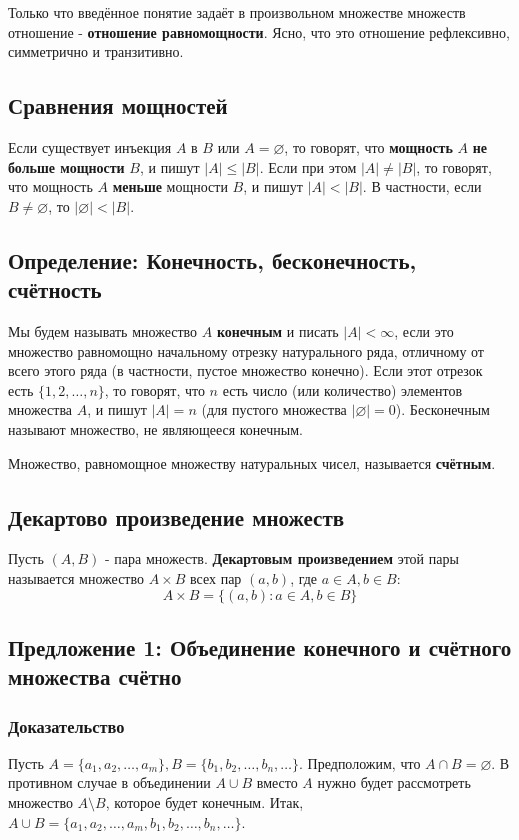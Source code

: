 \documentclass{article}
\begin{document}
Только что введённое понятие задаёт в произвольном множестве множеств отношение - \textbf{отношение равномощности}. Ясно, что это отношение рефлексивно, симметрично и транзитивно.

\subsection{Сравнения мощностей}

Если существует инъекция $A$ в $B$ или $A = \varnothing$, то говорят, что \textbf{мощность} $A$ \textbf{не больше мощности} $B$, и пишут $|A| \leq |B|$. Если при этом $|A| \neq |B|$, то говорят, что мощность $A$ \textbf{меньше} мощности $B$, и пишут $|A| < |B|$. В частности, если $B \neq \varnothing$, то $|\varnothing| < |B|$.

\subsection{Определение: Конечность, бесконечность, счётность}

Мы будем называть множество $A$ \textbf{конечным} и писать $|A| < \infty$, если это множество равномощно начальному отрезку натурального ряда, отличному от всего этого ряда (в частности, пустое множество конечно). Если этот отрезок есть $\{1, 2, \dots, n\}$, то говорят, что $n$ есть число (или количество) элементов множества $A$, и пишут $|A| = n$ (для пустого множества $|\varnothing| = 0$). Бесконечным называют множество, не являющееся конечным.

Множество, равномощное множеству натуральных чисел, называется \textbf{счётным}.

\subsection{Декартово произведение множеств}

Пусть $(A, B)$ - пара множеств. \textbf{Декартовым произведением} этой пары называется множество $A \times B$ всех пар $(a, b)$, где $a \in A, b \in B$: \[
	A \times B = \{(a, b):a \in A, b \in B\}
\]

\subsection{Предложение 1: Объединение конечного и счётного множества счётно}
\subsubsection*{Доказательство}
Пусть $A = \{a_1, a_2, \dots, a_m\}, B = \{b_1, b_2, \dots, b_n, \dots\}$. Предположим, что $A \cap B = \varnothing$. В противном случае в объединении $A \cup B$ вместо $A$ нужно будет рассмотреть множество $A \setminus B$, которое будет конечным. Итак, $A \cup B = \{a_1, a_2, \dots, a_m, b_1, b_2, \dots, b_n, \dots\}$.
\end{document}
